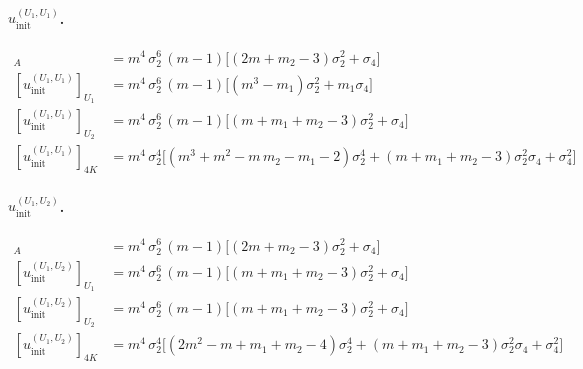 \documentclass[12pt,a4paper]{article}
\begin{document}
\paragraph{$u^{(U_{1}, U_{1})}_{\mathrm{init}}$.}
\begin{align*}
[u^{(U_{1}, U_{1})}_{\mathrm{init}}]_{A}
  &= m^{4}\,\sigma_{2}^{6}\,(m-1)\bigl[(2m + m_{2} - 3)\sigma_{2}^{2} + \sigma_{4}\bigr]\\
[u^{(U_{1}, U_{1})}_{\mathrm{init}}]_{U_{1}}
  &= m^{4}\,\sigma_{2}^{6}\,(m-1)\bigl[(m^{3} - m_{1})\sigma_{2}^{2} + m_{1}\sigma_{4}\bigr]\\
[u^{(U_{1}, U_{1})}_{\mathrm{init}}]_{U_{2}}
  &= m^{4}\,\sigma_{2}^{6}\,(m-1)\bigl[(m + m_{1} + m_{2} - 3)\sigma_{2}^{2} + \sigma_{4}\bigr]\\
[u^{(U_{1}, U_{1})}_{\mathrm{init}}]_{4K}
  &= m^{4}\,\sigma_{2}^{4}\bigl[
       (m^{3} + m^{2} - m\,m_{2} - m_{1} - 2)\sigma_{2}^{4}
       + (m + m_{1} + m_{2} - 3)\sigma_{2}^{2}\sigma_{4} + \sigma_{4}^{2}\bigr]
\end{align*}

\paragraph{$u^{(U_{1}, U_{2})}_{\mathrm{init}}$.}
\begin{align*}
[u^{(U_{1}, U_{2})}_{\mathrm{init}}]_{A}
  &= m^{4}\,\sigma_{2}^{6}\,(m-1)\bigl[(2m + m_{2} - 3)\sigma_{2}^{2} + \sigma_{4}\bigr]\\
[u^{(U_{1}, U_{2})}_{\mathrm{init}}]_{U_{1}}
  &= m^{4}\,\sigma_{2}^{6}\,(m-1)\bigl[(m + m_{1} + m_{2} - 3)\sigma_{2}^{2} + \sigma_{4}\bigr]\\
[u^{(U_{1}, U_{2})}_{\mathrm{init}}]_{U_{2}}
  &= m^{4}\,\sigma_{2}^{6}\,(m-1)\bigl[(m + m_{1} + m_{2} - 3)\sigma_{2}^{2} + \sigma_{4}\bigr]\\
[u^{(U_{1}, U_{2})}_{\mathrm{init}}]_{4K}
  &= m^{4}\,\sigma_{2}^{4}\bigl[
       (2m^{2} - m + m_{1} + m_{2} - 4)\sigma_{2}^{4}
       + (m + m_{1} + m_{2} - 3)\sigma_{2}^{2}\sigma_{4} + \sigma_{4}^{2}\bigr]
\end{align*}
\end{document}
